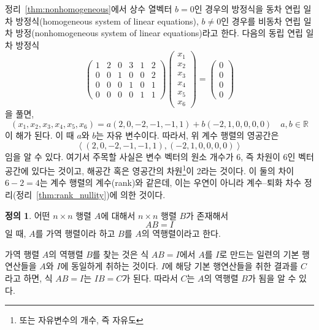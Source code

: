 \documentclass[unfonts,oneside,a4paper]{oblivoir}
\theoremstyle{definition}
\newtheorem{definition}{정의}
\theoremstyle{theorem}
\theoremstyle{remark}
\theoremstyle{remark}
\theoremstyle{remark}
\theoremstyle{remark}
\renewcommand{\vec}[1]{\bm{\mathit{#1}}}
\newcommand{\vecz}{\bm{\mathrm{0}}}
\begin{document}
정리~\ref{thm:nonhomogeneous}에서 상수 열벡터 $\vec b = \vecz$인 경우의 방정식을 동차 연립 일차 방정식(homogeneous system of linear equations), $\vec b \neq \vecz$인 경우를 비동차 연립 일차 방정(nonhomogeneous system of linear equations)라고 한다.
다음의 동립 연립 일차 방정식
\begin{equation*}
    \begin{pmatrix}
        1 & 2 & 0 & 3 & 1 & 2\\
        0 & 0 & 1 & 0 & 0 & 2\\
        0 & 0 & 0 & 1 & 0 & 1\\
        0 & 0 & 0 & 0 & 1 & 1
    \end{pmatrix}
    \begin{pmatrix}
        x_1\\
        x_2\\
        x_3\\
        x_4\\
        x_5\\
        x_6
    \end{pmatrix}
    =
    \begin{pmatrix}
        0\\
        0\\
        0\\
        0
    \end{pmatrix}
\end{equation*}
을 풀면,
\begin{equation*}
    (x_1, x_2, x_3, x_4, x_5, x_6) = a(2, 0, -2, -1, -1, 1) + b(-2, 1, 0, 0, 0, 0)\quad a, b \in \mathbb R
\end{equation*}
이 해가 된다.
이 때 $a$와 $b$는 자유 변수이다.
따라서, 위 계수 행렬의 영공간은
\begin{equation*}
    \left<(2, 0, -2, -1, -1, 1), (-2, 1, 0, 0, 0, 0)\right>
\end{equation*}
임을 알 수 있다.
여기서 주목할 사실은 변수 벡터의 원소 개수가 6, 즉 차원이 6인 벡터 공간에 있다는 것이고, 해공간 혹은 영공간의 차원\footnote{또는 자유변수의 개수, 즉 자유도}이 2라는 것이다.
이 둘의 차이 $6 - 2 = 4$는 계수 행렬의 계수(rank)와 같은데, 이는 우연이 아니라 계수--퇴화 차수 정리(정리~\ref{thm:rank_nullity})에 의한 것이다.

\begin{definition}
    어떤 $n \times n$ 행렬 $A$에 대해서 $n \times n$ 행렬 $B$가 존재해서
    \begin{equation*}
        A B = I
    \end{equation*}
    일 때, $A$를 가역 행렬이라 하고 $B$를 $A$의 역행렬이라고 한다.
\end{definition}

가역 행렬 $A$의 역행렬 $B$를 찾는 것은 식 $AB = I$에서 $A$를 $I$로 만드는 일련의 기본 행연산들을 $A$와 $I$에 동일하게 취하는 것이다.
$I$에 해당 기본 행연산들을 취한 결과를 $C$라고 하면, 식 $AB = I$는 $IB = C$가 된다.
따라서 $C$는 $A$의 역행렬 $B$가 됨을 알 수 있다.
\end{document}
